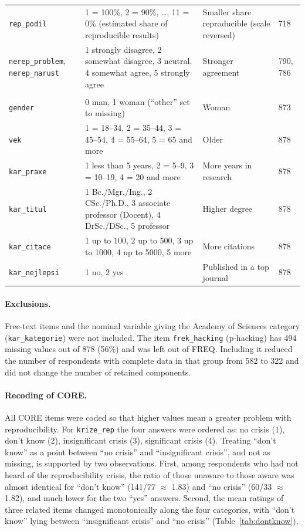 \documentclass[11pt,a4paper]{article}
\newcommand{\var}[1]{\texttt{#1}}
\begin{document}
{\begin{longtable}{@{}L{2.7cm} L{5.9cm} L{3.3cm} L{2.6cm}@{}}
\var{rep\_podil} & 1 = 100\%, 2 = 90\%, \dots, 11 = 0\% (estimated share of reproducible results) & Smaller share reproducible (scale reversed) & 718\\
\var{nerep\_problem}, \var{nerep\_narust} & 1 strongly disagree, 2 somewhat disagree, 3 neutral, 4 somewhat agree, 5 strongly agree & Stronger agreement & 790, 786\\
\addlinespace
{}\\
\var{gender} & 0 man, 1 woman (``other'' set to missing) & Woman & 873\\
\var{vek} & 1 = 18--34, 2 = 35--44, 3 = 45--54, 4 = 55--64, 5 = 65 and more & Older & 878\\
\var{kar\_praxe} & 1 less than 5 years, 2 = 5--9, 3 = 10--19, 4 = 20 and more & More years in research & 878\\
\var{kar\_titul} & 1 Bc./Mgr./Ing., 2 CSc./Ph.D., 3 associate professor (Docent), 4 DrSc./DSc., 5 professor & Higher degree & 878\\
\var{kar\_citace} & 1 up to 100, 2 up to 500, 3 up to 1000, 4 up to 5000, 5 more & More citations & 878\\
\var{kar\_nejlepsi} & 1 no, 2 yes & Published in a top journal & 878\\
\end{longtable}
}


\paragraph{Exclusions.}
Free-text items and the nominal variable giving the Academy of Sciences category (\var{kar\_kategorie}) were not included. The item \var{frek\_hacking} (p-hacking) has 494 missing values out of 878 (56\%) and was left out of FREQ. Including it reduced the number of respondents with complete data in that group from 582 to 322 and did not change the number of retained components.

\paragraph{Recoding of CORE.}
All CORE items were coded so that higher values mean a greater problem with reproducibility. For \var{krize\_rep} the four answers were ordered as: no crisis (1), don't know (2), insignificant crisis (3), significant crisis (4). Treating ``don't know'' as a point between ``no crisis'' and ``insignificant crisis'', and not as missing, is supported by two observations. First, among respondents who had not heard of the reproducibility crisis, the ratio of those unaware to those aware was almost identical for ``don't know'' (141/77 $\approx$ 1.83) and ``no crisis'' (60/33 $\approx$ 1.82), and much lower for the two ``yes'' answers. Second, the mean ratings of three related items changed monotonically along the four categories, with ``don't know'' lying between ``insignificant crisis'' and ``no crisis'' (Table~\ref{tab:dontknow}).
\end{document}
